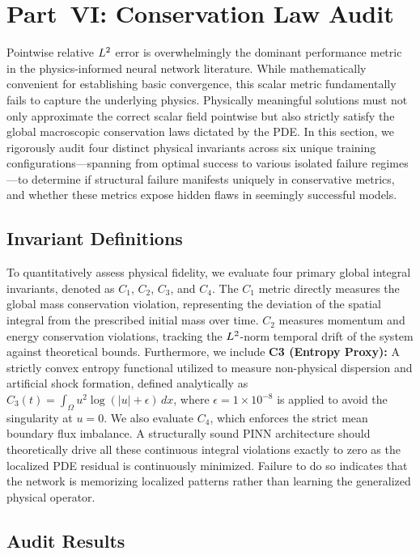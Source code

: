 \section{Part~VI: Conservation Law Audit}\label{sec:part6}

Pointwise relative $L^2$ error is overwhelmingly the dominant performance metric in the physics-informed neural network literature. While mathematically convenient for establishing basic convergence, this scalar metric fundamentally fails to capture the underlying physics. Physically meaningful solutions must not only approximate the correct scalar field pointwise but also strictly satisfy the global macroscopic conservation laws dictated by the PDE. In this section, we rigorously audit four distinct physical invariants across six unique training configurations—spanning from optimal success to various isolated failure regimes—to determine if structural failure manifests uniquely in conservative metrics, and whether these metrics expose hidden flaws in seemingly successful models.

\subsection{Invariant Definitions}\label{sec:exp24}\label{sec:exp26}

To quantitatively assess physical fidelity, we evaluate four primary global integral invariants, denoted as $C_1$, $C_2$, $C_3$, and $C_4$. The $C_1$ metric directly measures the global mass conservation violation, representing the deviation of the spatial integral from the prescribed initial mass over time. $C_2$ measures momentum and energy conservation violations, tracking the $L^2$-norm temporal drift of the system against theoretical bounds. Furthermore, we include \textbf{C3 (Entropy Proxy):} A strictly convex entropy functional utilized to measure non-physical dispersion and artificial shock formation, defined analytically as $C_3(t) = \int_{\Omega} u^2 \log(|u| + \epsilon) \,dx$, where $\epsilon = 1 \times 10^{-8}$ is applied to avoid the singularity at $u=0$. We also evaluate $C_4$, which enforces the strict mean boundary flux imbalance. A structurally sound PINN architecture should theoretically drive all these continuous integral violations exactly to zero as the localized PDE residual is continuously minimized. Failure to do so indicates that the network is memorizing localized patterns rather than learning the generalized physical operator.

\subsection{Audit Results}\label{sec:exp26_results}

